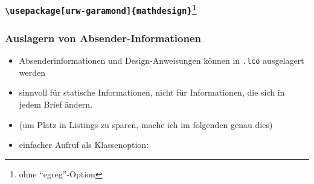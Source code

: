 \documentclass[12pt,ngerman]{beamer}
\begin{document}
\begin{frame}
\frametitle{\texttt{\textbackslash usepackage[urw-garamond]\{mathdesign\}}\footnote{ohne \enquote{egreg}-Option}}

\vspace*{-0.75cm}\begin{center}
\end{center}

\end{frame}


\begin{frame}[containsverbatim]
\frametitle{Auslagern von Absender-Informationen}

\begin{itemize}
\item Absenderinformationen und Design-Anweisungen können in \texttt{.lco} ausgelagert werden
\item sinnvoll für statische Informationen, nicht für Informationen, die sich in jedem Brief ändern.
\item (um Platz in Listings zu sparen, mache ich im folgenden genau dies)
\item einfacher Aufruf als Klassenoption:
\end{itemize}




\end{frame}
\end{document}
